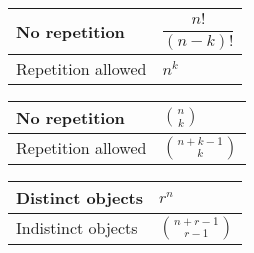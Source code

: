 


\begin{tcolorbox}[colback=red!5!white,colframe=red!70!black,title=Order Matters]
\begin{tabular}{|>{\raggedright}m{6cm}|>{\centering\arraybackslash}m{4cm}|}
\hline
No repetition & $\dfrac{n!}{(n-k)!}$ \\
\hline
Repetition allowed & $n^k$ \\
\hline
\end{tabular}
\end{tcolorbox}

\begin{tcolorbox}[colback=green!5!white,colframe=green!60!black,title=Order Does Not Matter]
\begin{tabular}{|>{\raggedright}m{6cm}|>{\centering\arraybackslash}m{4cm}|}
\hline
No repetition & $\binom{n}{k}$ \\
\hline
Repetition allowed & $\binom{n+k-1}{k}$ \\
\hline
\end{tabular}
\end{tcolorbox}

\begin{tcolorbox}[colback=blue!5!white,colframe=blue!70!black,title=Distributing $n$ Objects into $r$ Buckets]
\begin{tabular}{|>{\raggedright}m{6cm}|>{\centering\arraybackslash}m{4cm}|}
\hline
Distinct objects & $r^n$ \\
\hline
Indistinct objects & $\binom{n+r-1}{r-1}$ \\
\hline
\end{tabular}
\end{tcolorbox}


